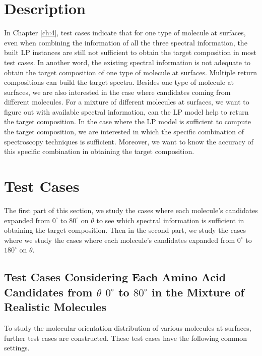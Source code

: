  \label{ch:5}
\section{Description}

In Chapter \ref{ch:4}, test cases indicate that for one type of molecule at surfaces, even when combining the information of all the three spectral information, the built LP instances are still not sufficient to obtain the target composition in most test cases. In another word, the existing spectral information is not adequate to obtain the target composition of one type of molecule at surfaces. Multiple return compositions can build the target spectra. Besides one type of molecule at surfaces, we are also interested in the case where candidates coming from different molecules. For a mixture of different molecules at surfaces, we want to figure out with available spectral information, can the LP model help to return the target composition. In the case where the LP model is sufficient to compute the target composition, we are interested in which the specific combination of spectroscopy techniques is sufficient. Moreover, we want to know the accuracy of this specific combination in obtaining the target composition. \\

\section{Test Cases}
The first part of this section, we study the cases where each molecule's candidates expanded from $0^{\circ}$ to $80^{\circ}$ on $\theta$ to see which spectral information is sufficient in obtaining the target composition. Then in the second part, we study the cases where we study the cases where each molecule's candidates expanded from $0^{\circ}$ to $180^{\circ}$ on $\theta$. \\

\subsection{Test Cases Considering Each Amino Acid Candidates from $\theta$ $0^{\circ}$ to $80^{\circ}$ in the Mixture of Realistic Molecules} \label{testcase51}
To study the molecular orientation distribution of various molecules at surfaces, further test cases are constructed. These test cases have the following common settings. \\

